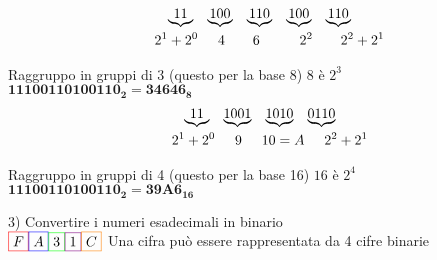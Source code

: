 \documentclass[a4paper, 12pt]{article} %
\begin{document}


\begin{gather*}
	\underbrace{\rm 11} \hspace{0.3cm}\underbrace{100} \hspace{0.3cm} \underbrace{110} \hspace{0.3cm} \underbrace{100} \hspace{0.3cm} \underbrace{110}\\
	\hspace{0.5cm}2^1 + 2^0 \hspace{0.5cm}4 \hspace{0.7cm} 6 \hspace{1cm} 2^2 \hspace{0.7cm} 2^2 + 2^1
\end{gather*}

\textsf{\normalsize{Raggruppo in gruppi di 3 (questo per la base 8) $ 8 \text{ è } 2^3$}} \\
$ \mathbf{11100110100110_2 = 34646_8} $ \\

\begin{gather*}
	\underbrace{\rm 11} \hspace{0.3cm}\underbrace{1001} \hspace{0.3cm} \underbrace{1010} \hspace{0.3cm} \underbrace{0110} \\
	\hspace{0.5cm}2^1 + 2^0 \hspace{0.5cm}9 \hspace{0.5cm}10 = A \hspace{0.5cm} 2^2 + 2^1
\end{gather*}

\textsf{\normalsize{Raggruppo in gruppi di 4 (questo per la base 16) $ 16 \text{ è } 2^4$}} \\
$ \mathbf{11100110100110_2 = 39A6_{16}} $ \break


\textsf{\large{\color{red} 3) Convertire i numeri esadecimali in binario}} \\

$ \color{red}\boxed{\normalcolor F} \color{blue}\boxed{\normalcolor A} \color{green}\boxed{\normalcolor 3} \color{violet}\boxed{\normalcolor 1} \color{orange}\boxed{\normalcolor C}$ \textsf{\normalsize{Una cifra può essere rappresentata da 4 cifre binarie}} \\
\end{document}
